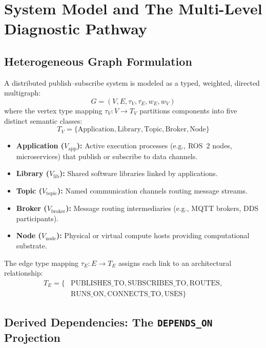 \section{System Model and The Multi-Level Diagnostic Pathway}
\label{sec:sag_model}

\subsection{Heterogeneous Graph Formulation}
\label{sec:model:formulation}

A distributed publish--subscribe system is modeled as a typed, weighted, directed multigraph:
\begin{equation}
G = (V, E, \tau_V, \tau_E, w_E, w_V)
\end{equation}
where the vertex type mapping $\tau_V : V \to T_V$ partitions components into five distinct semantic classes:
\begin{equation}
T_V = \{\text{Application}, \text{Library}, \text{Topic}, \text{Broker}, \text{Node}\}
\end{equation}
\begin{itemize}
    \item \textbf{Application ($V_{\text{app}}$):} Active execution processes (e.g., ROS~2 nodes, microservices) that publish or subscribe to data channels.
    \item \textbf{Library ($V_{\text{lib}}$):} Shared software libraries linked by applications.
    \item \textbf{Topic ($V_{\text{topic}}$):} Named communication channels routing message streams.
    \item \textbf{Broker ($V_{\text{broker}}$):} Message routing intermediaries (e.g., MQTT brokers, DDS participants).
    \item \textbf{Node ($V_{\text{node}}$):} Physical or virtual compute hosts providing computational substrate.
\end{itemize}

The edge type mapping $\tau_E : E \to T_E$ assigns each link to an architectural relationship:
\begin{equation}
\begin{split}
T_E = \{ & \text{PUBLISHES\_TO}, \text{SUBSCRIBES\_TO}, \text{ROUTES}, \\
        & \text{RUNS\_ON}, \text{CONNECTS\_TO}, \text{USES}\}
\end{split}
\end{equation}

\subsection{Derived Dependencies: The \texttt{DEPENDS\_ON} Projection}
\label{sec:model:projection}

